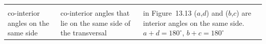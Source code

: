 \begin{table}[H]
\begin{center}
\begin{xtabular*}{\mytablewidth}[t]{|p{3cm}|p{3cm}|p{3cm}|p{20\mystarwidth}|}
\begin{center}
      \vspace{2pt}
    \vspace{.1in}
    
    \end{center}



    \addtocounter{footnote}{-0}
    
     \tabularnewline{}
    
    
        co-interior angles on the same side &
    
    
        co-interior angles that lie on the same side of the transversal &
    
    
        in Figure~13.13 (\begin{math}a\end{math},\begin{math}d\end{math}) and (\begin{math}b\end{math},\begin{math}c\end{math}) are interior angles on the same side. \begin{math}a+d={180}^{\circ }\end{math}, \begin{math}b+c={180}^{\circ }\end{math} &
    
    
        
                  
    \setcounter{subfigure}{0}


\end{xtabular*}
\end{center}
\end{table}
